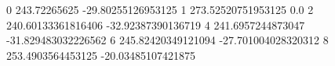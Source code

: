 0 243.72265625 -29.80255126953125
1 273.52520751953125 0.0
2 240.60133361816406 -32.92387390136719
4 241.6957244873047 -31.829483032226562
6 245.82420349121094 -27.701004028320312
8 253.4903564453125 -20.03485107421875
